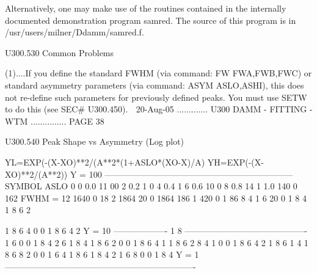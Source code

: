    Alternatively,   one  may  make  use  of  the  routines  contained  in  the
   internally documented demonstration program  samred.  The  source  of  this
   program is in /usr/users/milner/Ddamm/samred.f.
 
   U300.530  Common Problems
 
   (1)....If  you  define  the  standard FWHM (via command: FW FWA,FWB,FWC) or
          standard asymmetry parameters (via command:  ASYM  ASLO,ASHI),  this
          does  not  re-define  such  parameters for previously defined peaks.
          You must use SETW to do this (see SEC# U300.450).
    
   20-Aug-05 ............. U300  DAMM - FITTING - WTM ............... PAGE  38
 
   U300.540  Peak Shape vs Asymmetry (Log plot)
 
            YL=EXP(-(X-XO)**2/(A**2*(1+ASLO*(XO-X)/A)
            YH=EXP(-(X-XO)**2/(A**2))
   Y = 100  ------------------------------------------------------------------
            SYMBOL  ASLO                            0
                 0   0.0                          11 00
                 2   0.2                         1     0
                 4   0.4                        1
                 6   0.6                       10       0
                 8   0.8                      14
                 1   1.0                     140         0
                                            162
              FWHM = 12                    1640           0
                                          18 2
                                         1864
                                            20             0
                                        1864
                                       186
                                      1   420               0
                                     1 86
                                      8  4
                                    1  6  20                 0
                                   1 8  4
                                  1 8 6  2
 
                                 1 8 6 4  0                   0
                                1
                                  8 6 4 2
   Y = 10  ------------------- 1 8 -------------------------------------------
                              1    6     0                     0
                             1  8    4 2
                                  6
                            1  8    4
                           1  8  6    2
                                        0                       0
                          1  8  6  4
                         1
                        1   8  6     2
                           8      4
                       1               0                         0
                      1   8   6  4
                                    2
                     1   8   6
                    1           4
                   1    8   6
                       8           2  0                           0
                  1        6   4
                 1    8
                          6
                1    8        4   2
               1         6
                    8                0                             0
              1    8         4
   Y = 1   -------------------------------------------------------------------
 
